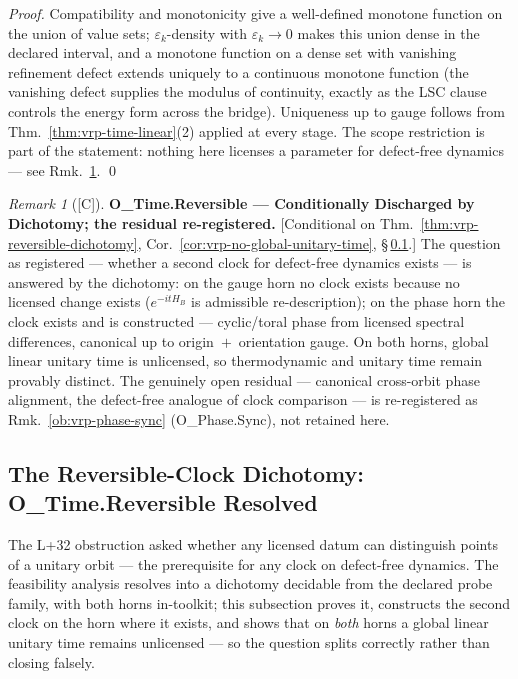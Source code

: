 \documentclass[12pt,oneside]{amsbook}
\theoremstyle{plain}
\theoremstyle{definition}
\theoremstyle{remark}
\newtheorem{remark}[theorem]{Remark}
\newcommand{\status}[1]{\textup{[#1]}}
\begin{document}
\begin{proof}
Compatibility and monotonicity give a well-defined monotone
function on the union of value sets; $\varepsilon_k$-density with
$\varepsilon_k \to 0$ makes this union dense in the declared
interval, and a monotone function on a dense set with vanishing
refinement defect extends uniquely to a continuous monotone
function (the vanishing defect supplies the modulus of
continuity, exactly as the LSC clause controls the energy form
across the bridge).  Uniqueness up to gauge follows from
Thm.~\ref{thm:vrp-time-linear}(2) applied at every stage.  The
scope restriction is part of the statement: nothing here
licenses a parameter for defect-free dynamics --- see
Rmk.~\ref{ob:vrp-time-reversible}. \qed
\end{proof}

\begin{remark}[\status{C}]\label{ob:vrp-time-reversible}
\textbf{O\_Time.Reversible --- Conditionally Discharged by
Dichotomy; the residual re-registered.}
\textup{[Conditional on
Thm.~\ref{thm:vrp-reversible-dichotomy},
Cor.~\ref{cor:vrp-no-global-unitary-time},
\S\,\ref{sec:vrp-reversible}.]}
The question as registered --- whether a second clock for
defect-free dynamics exists --- is answered by the dichotomy:
on the gauge horn no clock exists because no licensed change
exists ($e^{-itH_B}$ is admissible re-description); on the phase
horn the clock exists and is constructed --- cyclic/toral phase
from licensed spectral differences, canonical up to
origin~$+$~orientation gauge.  On both horns, global linear
unitary time is unlicensed, so thermodynamic and unitary time
remain provably distinct.  The genuinely open residual ---
canonical cross-orbit phase alignment, the defect-free analogue
of clock comparison --- is re-registered as
Rmk.~\ref{ob:vrp-phase-sync} (O\_Phase.Sync), not retained here.
\end{remark}

\subsection{The Reversible-Clock Dichotomy: O\_Time.Reversible
Resolved}
\label{sec:vrp-reversible}

The L+32 obstruction asked whether any licensed datum can
distinguish points of a unitary orbit --- the prerequisite for any
clock on defect-free dynamics.  The feasibility analysis resolves
into a dichotomy decidable from the declared probe family, with
both horns in-toolkit; this subsection proves it, constructs the
second clock on the horn where it exists, and shows that on
\emph{both} horns a global linear unitary time remains unlicensed
--- so the question splits correctly rather than closing falsely.
\end{document}
